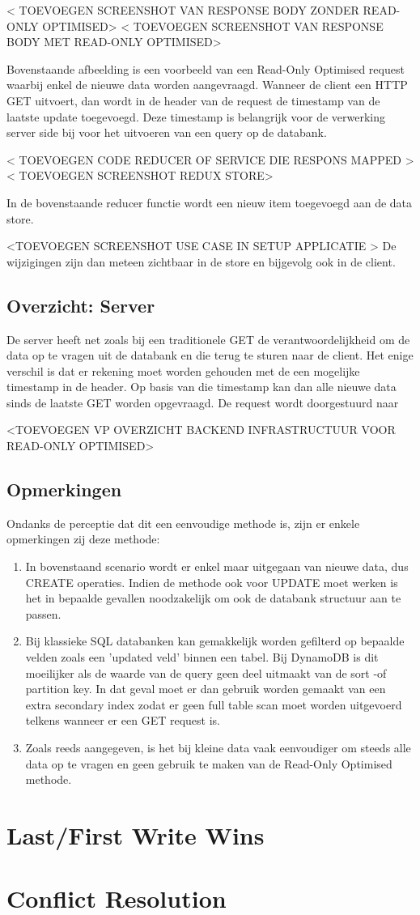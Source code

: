 < TOEVOEGEN SCREENSHOT VAN RESPONSE  BODY ZONDER READ-ONLY OPTIMISED>
< TOEVOEGEN SCREENSHOT VAN RESPONSE  BODY MET READ-ONLY OPTIMISED>

Bovenstaande afbeelding is een voorbeeld van een Read-Only Optimised request waarbij enkel de nieuwe data worden aangevraagd. Wanneer de client een HTTP GET uitvoert, dan wordt in de header van de request de timestamp van de laatste update toegevoegd. Deze timestamp is belangrijk voor de verwerking server side bij voor het uitvoeren van een query op de databank.

< TOEVOEGEN CODE REDUCER OF SERVICE DIE RESPONS MAPPED >
< TOEVOEGEN SCREENSHOT REDUX STORE>

In de bovenstaande reducer functie wordt een nieuw item toegevoegd aan de data store.

<TOEVOEGEN SCREENSHOT USE CASE IN SETUP APPLICATIE >
De wijzigingen zijn dan meteen zichtbaar in de store en bijgevolg ook in de client.
\subsection{Overzicht: Server}
De server heeft net zoals bij een traditionele GET de verantwoordelijkheid om de data op te vragen uit de databank en die terug te sturen naar de client. Het enige verschil is dat er rekening moet worden gehouden met de een mogelijke timestamp in de header. Op basis van die timestamp kan dan alle nieuwe data sinds de laatste GET worden opgevraagd. De request wordt doorgestuurd naar 

<TOEVOEGEN VP OVERZICHT BACKEND INFRASTRUCTUUR VOOR READ-ONLY OPTIMISED>

\subsection{Opmerkingen}
Ondanks de perceptie dat dit een eenvoudige methode is, zijn er enkele opmerkingen zij deze methode:
\begin{enumerate}
\item In bovenstaand scenario wordt er enkel maar uitgegaan van nieuwe data, dus CREATE operaties. Indien de methode ook voor UPDATE moet werken is het in bepaalde gevallen noodzakelijk om ook de databank structuur aan te passen.
\item Bij klassieke SQL databanken kan gemakkelijk worden gefilterd op bepaalde velden zoals een 'updated veld' binnen een tabel. Bij DynamoDB is dit moeilijker als de waarde van de query geen deel uitmaakt van de sort -of partition key. In dat geval moet er dan gebruik worden gemaakt van een extra secondary index zodat er geen full table scan moet worden uitgevoerd telkens wanneer er een GET request is.
\item Zoals reeds aangegeven, is het bij kleine data vaak eenvoudiger om steeds alle data op te vragen en geen gebruik te maken van de Read-Only Optimised methode.
\end{enumerate}

\section{Last/First Write Wins}
\section{Conflict Resolution}
